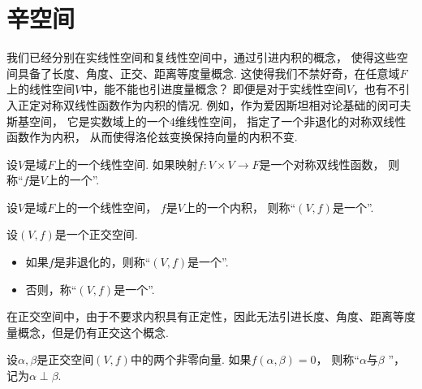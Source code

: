 \section{辛空间}
我们已经分别在实线性空间和复线性空间中，通过引进内积的概念，
使得这些空间具备了长度、角度、正交、距离等度量概念.
这使得我们不禁好奇，在任意域\(F\)上的线性空间\(V\)中，能不能也引进度量概念？
即便是对于实线性空间\(V\)，也有不引入正定对称双线性函数作为内积的情况.
例如，作为爱因斯坦相对论基础的闵可夫斯基空间，
它是实数域上的一个4维线性空间，
指定了一个非退化的对称双线性函数作为内积，
从而使得洛伦兹变换保持向量的内积不变.

\begin{definition}
设\(V\)是域\(F\)上的一个线性空间.
如果映射\(f\colon V \times V \to F\)是一个对称双线性函数，
则称“\(f\)是\(V\)上的一个”.
\end{definition}

\begin{definition}
设\(V\)是域\(F\)上的一个线性空间，
\(f\)是\(V\)上的一个内积，
则称“\((V,f)\)是一个”.
\end{definition}

\begin{definition}
设\((V,f)\)是一个正交空间.
\begin{itemize}
	\item 如果\(f\)是非退化的，则称“\((V,f)\)是一个”.
	\item 否则，称“\((V,f)\)是一个”.
\end{itemize}
\end{definition}

在正交空间中，由于不要求内积具有正定性，因此无法引进长度、角度、距离等度量概念，但是仍有正交这个概念.
\begin{definition}
设\(\alpha,\beta\)是正交空间\((V,f)\)中的两个非零向量.
如果\(f(\alpha,\beta) = 0\)，
则称“\(\alpha\)与\(\beta\) ”，
记为\(\alpha \perp \beta\).
\end{definition}
